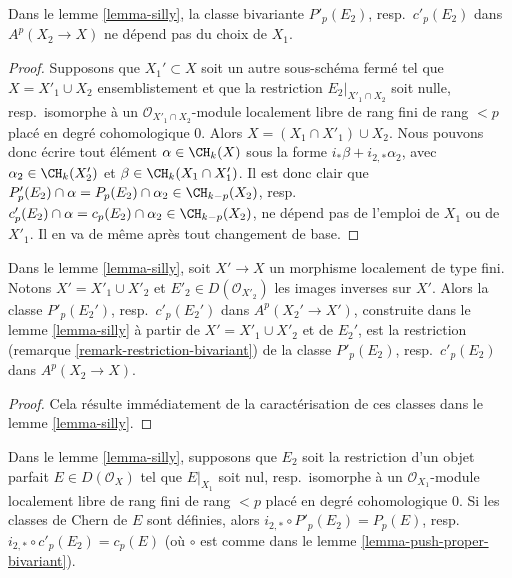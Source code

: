 \begin{lemma}
\label{lemma-silly-independent}
Dans le lemme \ref{lemma-silly}, la classe bivariante
$P'_p(E_2)$, resp.\ $c'_p(E_2)$ dans $A^p(X_2 \to X)$
ne dépend pas du choix de $X_1$.
\end{lemma}

\begin{proof}
Supposons que $X_1' \subset X$ soit un autre sous-schéma fermé tel que
$X = X'_1 \cup X_2$ ensemblistement et que la restriction
$E_2|_{X'_1 \cap X_2}$ soit nulle, resp.\ isomorphe à un
$\mathcal{O}_{X'_1 \cap X_2}$-module localement libre de rang fini
de rang $< p$ placé en degré cohomologique $0$.
Alors $X = (X_1 \cap X'_1) \cup X_2$. Nous pouvons donc écrire
tout élément $\alpha \in \CH_k(X)$ sous la forme $i_*\beta + i_{2, *}\alpha_2$, avec
$\alpha_2 \in \CH_k(X'_2)$ et $\beta \in \CH_k(X_1 \cap X'_1)$.
Il est donc clair que
$P'_p(E_2) \cap \alpha = P_p(E_2) \cap \alpha_2 \in \CH_{k - p}(X_2)$,
resp.\  $c'_p(E_2) \cap \alpha = c_p(E_2) \cap \alpha_2 \in \CH_{k - p}(X_2)$,
ne dépend pas de l'emploi de $X_1$ ou de $X'_1$. Il en va de même
après tout changement de base.
\end{proof}

\begin{lemma}
\label{lemma-base-change-silly}
Dans le lemme \ref{lemma-silly}, soit $X' \to X$ un morphisme
localement de type fini. Notons $X' = X'_1 \cup X'_2$
et $E'_2 \in D(\mathcal{O}_{X'_2})$ les images inverses sur $X'$.
Alors la classe $P'_p(E_2')$, resp.\ $c'_p(E_2')$ dans
$A^p(X_2' \to X')$, construite dans le lemme \ref{lemma-silly} à partir de
$X' = X'_1 \cup X'_2$ et de $E_2'$, est la restriction
(remarque \ref{remark-restriction-bivariant})
de la classe $P'_p(E_2)$, resp.\ $c'_p(E_2)$ dans $A^p(X_2 \to X)$.
\end{lemma}

\begin{proof}
Cela résulte immédiatement de la caractérisation de ces classes dans le
lemme \ref{lemma-silly}.
\end{proof}

\begin{lemma}
\label{lemma-silly-silly}
Dans le lemme \ref{lemma-silly}, supposons que $E_2$ soit la restriction d'un objet
parfait $E \in D(\mathcal{O}_X)$ tel que $E|_{X_1}$ soit nul,
resp.\ isomorphe à un $\mathcal{O}_{X_1}$-module localement libre de rang fini
de rang $< p$ placé en degré cohomologique $0$.
Si les classes de Chern de $E$ sont définies, alors
$i_{2, *} \circ P'_p(E_2) = P_p(E)$,
resp.\ $i_{2, *} \circ c'_p(E_2) = c_p(E)$
(où $\circ$ est comme dans le lemme \ref{lemma-push-proper-bivariant}).
\end{lemma}

